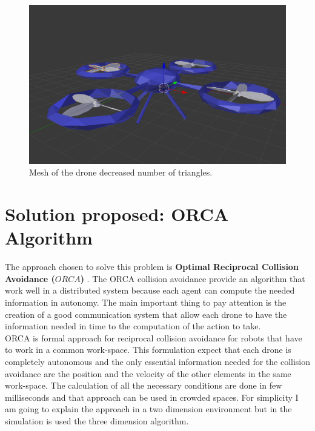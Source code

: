 \documentclass[11pt,twocolumn]{article}
\begin{document}
\begin{figure}
\centering
\includegraphics[scale=0.12]{droneSimple.png}
\caption{Mesh of the drone decreased number of triangles. }
\label{fig:2}
\end{figure}

\section{Solution proposed: ORCA Algorithm}
\label{sec:collision avoidance}
The approach chosen to solve this problem is \textbf{Optimal Reciprocal Collision Avoidance ($\mathit{ORCA}$)} \cite{DBLP:conf/dars/Alonso-MoraBRBS10}. The ORCA collision avoidance provide an algorithm that work well in a distributed system because each agent can compute the needed information in autonomy. The main important thing to pay attention is the creation of a good communication system that allow each drone to have the information needed in time to the computation of the action to take.
\\
ORCA is formal approach for reciprocal collision avoidance for robots that have to work in a common work-space. This formulation expect that each drone is completely autonomous and the only essential information needed for the collision avoidance are the position and the velocity of the other elements in the same work-space. The calculation of all the necessary conditions are done in few milliseconds and that approach can be used in crowded spaces. For simplicity I am going to explain the approach in a two dimension environment but in the simulation is used the three dimension algorithm.
\end{document}
